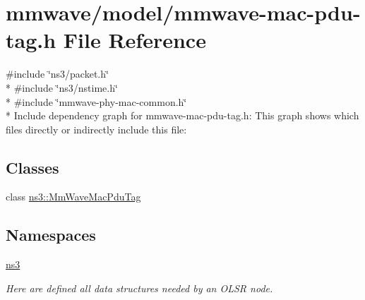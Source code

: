 \hypertarget{mmwave-mac-pdu-tag_8h}{}\section{mmwave/model/mmwave-\/mac-\/pdu-\/tag.h File Reference}
\label{mmwave-mac-pdu-tag_8h}
{\ttfamily \#include \char`\"{}ns3/packet.\+h\char`\"{}}\\*
{\ttfamily \#include \char`\"{}ns3/nstime.\+h\char`\"{}}\\*
{\ttfamily \#include \char`\"{}mmwave-\/phy-\/mac-\/common.\+h\char`\"{}}\\*
Include dependency graph for mmwave-\/mac-\/pdu-\/tag.h\+:
This graph shows which files directly or indirectly include this file\+:
\subsection*{Classes}
\begin{DoxyCompactItemize}
\item 
class \hyperlink{classns3_1_1MmWaveMacPduTag}{ns3\+::\+Mm\+Wave\+Mac\+Pdu\+Tag}
\end{DoxyCompactItemize}
\subsection*{Namespaces}
\begin{DoxyCompactItemize}
\item 
 \hyperlink{namespacens3}{ns3}
\begin{DoxyCompactList}\small\item\em Here are defined all data structures needed by an O\+L\+SR node. \end{DoxyCompactList}\end{DoxyCompactItemize}
